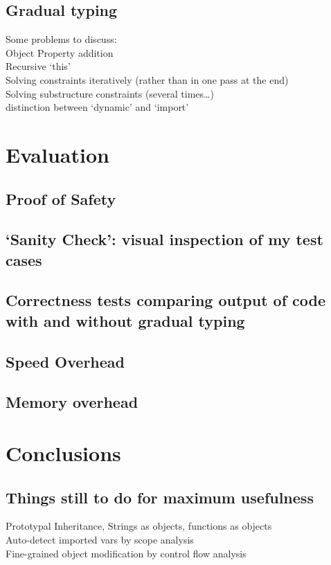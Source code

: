 \documentclass[12pt,a4paper,twoside,openright]{report}
\begin{document}
\section{Gradual typing}
Some problems to discuss: \\
Object Property addition \\
Recursive `this' \\
Solving constraints iteratively (rather than in one pass at the end) \\
Solving substructure constraints (several times\ldots) \\
distinction between `dynamic' and `import' \\
\chapter{Evaluation}\label{evaluation}
\section{Proof of Safety}
\section{`Sanity Check': visual inspection of my test cases}
\section{Correctness tests comparing output of code with and without gradual typing}
\section{Speed Overhead}
\section{Memory overhead}
\chapter{Conclusions}
\section{Things still to do for maximum usefulness}
Prototypal Inheritance, Strings as objects, functions as objects \\
Auto-detect imported vars by scope analysis \\
Fine-grained object modification by control flow analysis
\end{document}
